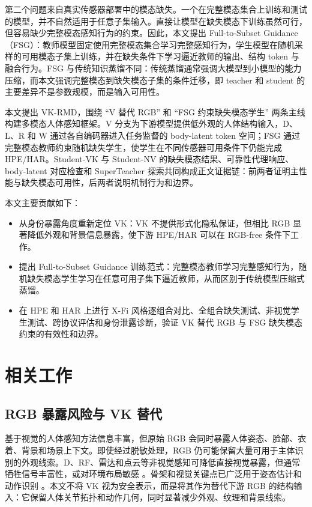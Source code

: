 ﻿\documentclass[UTF8,twocolumn]{ctexart}
\newcommand{\method}{VK-RMD}
\begin{document}
第二个问题来自真实传感器部署中的模态缺失。一个在完整模态集合上训练和测试的模型，并不自然适用于任意子集输入。直接让模型在缺失模态下训练虽然可行，但容易缺少完整模态感知行为的约束。因此，本文提出 Full-to-Subset Guidance（FSG）：教师模型固定使用完整模态集合学习完整感知行为，学生模型在随机采样的可用模态子集上训练，并在缺失条件下学习逼近教师的输出、结构 token 与融合行为。FSG 与传统知识蒸馏不同：传统蒸馏通常强调大模型到小模型的能力压缩，而本文强调完整模态到缺失模态子集的条件迁移，即 teacher 和 student 的主要差异不是参数规模，而是输入可用性。

本文提出 \method{}，围绕 “V 替代 RGB” 和 “FSG 约束缺失模态学生” 两条主线构建多模态人体感知框架。V 分支为下游模型提供低外观的人体结构输入，D、L、R 和 W 通过各自编码器进入任务监督的 body-latent token 空间；FSG 通过完整模态教师约束随机缺失学生，使学生在不同传感器可用条件下仍能完成 HPE/HAR。Student-VK 与 Student-NV 的缺失模态结果、可靠性代理响应、body-latent 对应检查和 SuperTeacher 探索共同构成正文证据链：前两者证明主性能与缺失模态可用性，后两者说明机制行为和边界。

本文主要贡献如下：
\begin{itemize}
    \item 从身份暴露角度重新定位 VK：VK 不提供形式化隐私保证，但相比 RGB 显著降低外观和背景信息暴露，使下游 HPE/HAR 可以在 RGB-free 条件下工作。
    \item 提出 Full-to-Subset Guidance 训练范式：完整模态教师学习完整感知行为，随机缺失模态学生学习在任意可用子集下逼近教师，从而区别于传统模型压缩式蒸馏。
    \item 在 HPE 和 HAR 上进行 X-Fi 风格逐组合对比、全组合缺失测试、非视觉学生测试、跨协议评估和身份泄露诊断，验证 VK 替代 RGB 与 FSG 缺失模态约束的有效性和边界。
\end{itemize}



\section{相关工作}
\subsection{RGB 暴露风险与 VK 替代}
基于视觉的人体感知方法信息丰富，但原始 RGB 会同时暴露人体姿态、脸部、衣着、背景和场景上下文。即使经过脱敏处理，RGB 仍可能保留大量可用于主体识别的外观线索。D、RF、雷达和点云等非视觉感知可降低直接视觉暴露，但通常牺牲信号丰富性，或对环境布局敏感 \cite{iot_survey,devicefree_review_iotj,occupant_wifi_iotj}。骨架和视觉关键点已广泛用于姿态估计和动作识别 \cite{openpose,stgcn,yan_skeleton_survey}。本文不将 VK 视为安全表示，而是将其作为替代下游 RGB 的结构输入：它保留人体关节拓扑和动作几何，同时显著减少外观、纹理和背景线索。
\end{document}
